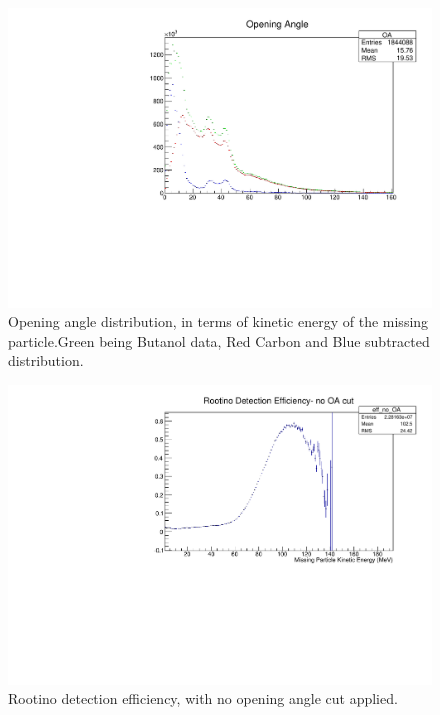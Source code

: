 \documentclass[a4paper,12pt]{article}
\begin{document}
\begin{figure}
\includegraphics[width=\textwidth]{oa_b4.pdf}
\caption{Opening angle distribution, in terms of kinetic energy of the missing particle.Green being Butanol data, Red Carbon and Blue subtracted distribution. }
\end{figure}

\begin{figure}
\includegraphics[width=\textwidth]{eff_no_oa.pdf}
\caption{Rootino detection efficiency, with no opening angle cut applied. }
\end{figure}
\end{document}
